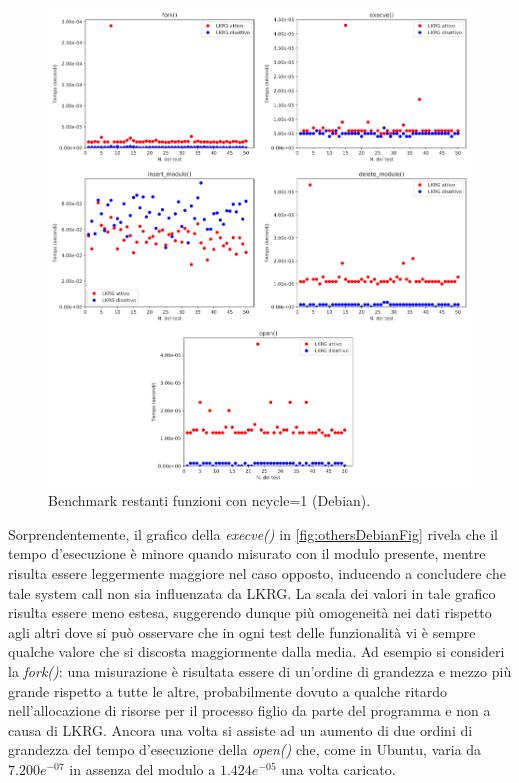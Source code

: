 \begin{figure}[!ht]
\centering
\includegraphics[scale=1.4]{Figures/Debian/SingleOthers}
\caption[Benchmark restanti funzioni con ncycle=1 (Debian)]{Benchmark restanti funzioni con ncycle=1 (Debian).}
\label{fig:othersDebianFig}
\end{figure}

Sorprendentemente, il grafico della \emph{execve()} in \autoref{fig:othersDebianFig} rivela che il tempo d'esecuzione è minore quando misurato con il modulo presente, mentre risulta essere leggermente maggiore nel caso opposto, inducendo a concludere che tale system call non sia influenzata da LKRG. La scala dei valori in tale grafico risulta essere meno estesa, suggerendo dunque più omogeneità nei dati rispetto agli altri dove si può osservare che in ogni test delle funzionalità vi è sempre qualche valore che si discosta maggiormente dalla media. Ad esempio si consideri la \emph{fork()}: una misurazione è risultata essere di un'ordine di grandezza e mezzo più grande rispetto a tutte le altre, probabilmente dovuto a qualche ritardo nell'allocazione di risorse per il processo figlio da parte del programma e non a causa di LKRG. Ancora una volta si assiste ad un aumento di due ordini di grandezza del tempo d'esecuzione della \emph{open()} che, come in Ubuntu, varia da $7.200e^{-07}$ in assenza del modulo a $1.424e^{-05}$ una volta caricato.

